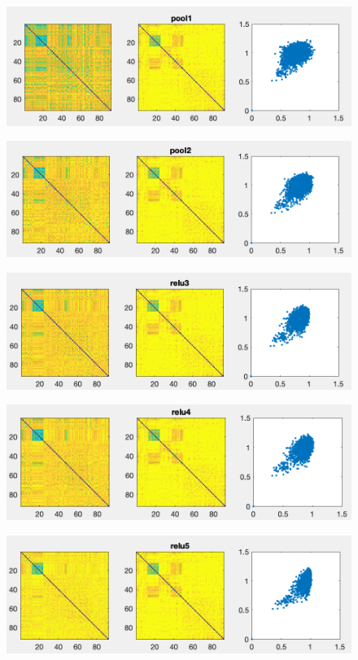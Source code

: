 \documentclass[]{article}
\begin{document}
\begin{figure}[H]
    \centering
    \includegraphics[width=0.7\linewidth]{problem2E_RDMpool1.png}
    \label{fig:my_label}
\end{figure}

\begin{figure}[H]
    \centering
    \includegraphics[width=0.7\linewidth]{problem2E_RDMpool2.png}
    \label{fig:my_label}
\end{figure}

\begin{figure}[H]
    \centering
    \includegraphics[width=0.7\linewidth]{problem2E_RDMrelu3.png}
    \label{fig:my_label}
\end{figure}

\begin{figure}[H]
    \centering
    \includegraphics[width=0.7\linewidth]{problem2E_RDMrelu4.png}
    \label{fig:my_label}
\end{figure}

\begin{figure}[H]
    \centering
    \includegraphics[width=0.7\linewidth]{problem2E_RDMrelu5.png}
    \label{fig:my_label}
\end{figure}
\end{document}
